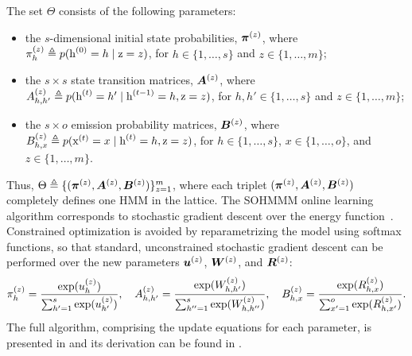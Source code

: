 The set $\Theta$ consists of the following parameters:
\begin{itemize}
	\item the $s$-dimensional initial state probabilities, ${\bm{\pi}}^{(z)}$, where ${\pi}_h^{(z)} \triangleq p({\textnormal{h}}^{(0)}=h \mid {\textnormal{z}}=z)$, for $h \in \{1,\dots,s\}$ and $z \in \{1,\dots,m\}$;
	\item the $s \times s$ state transition matrices, ${\bm{A}}^{(z)}$, where ${A}^{(z)}_{h,h'} \triangleq p({\textnormal{h}}^{(t)}=h' \mid {\textnormal{h}}^{(t-1)}=h, {\textnormal{z}}=z)$, for $h,h' \in \{1,\dots,s\}$ and $z \in \{1,\dots,m\}$;
	\item the $s \times o$ emission probability matrices, ${\bm{B}}^{(z)}$, where ${B}^{(z)}_{h,x} \triangleq p({\textnormal{x}}^{(t)}=x \mid {\textnormal{h}}^{(t)}=h, {\textnormal{z}}=z)$, for $h \in \{1,\dots,s\}$, $x \in \{1,\dots,o\}$, and $z \in \{1,\dots,m\}$.
\end{itemize}
Thus, $\Theta \triangleq \{({\bm{\pi}}^{(z)}, {\bm{A}}^{(z)}, {\bm{B}}^{(z)})\}_{z=1}^m$, where each triplet $({\bm{\pi}}^{(z)}, {\bm{A}}^{(z)}, {\bm{B}}^{(z)})$ completely defines one HMM in the lattice. The SOHMMM online learning algorithm corresponds to stochastic gradient descent over the energy function~. Constrained optimization is avoided by reparametrizing the model using softmax functions, so that standard, unconstrained stochastic gradient descent can be performed over the new parameters ${\bm{u}}^{(z)}$, ${\bm{W}}^{(z)}$, and ${\bm{R}}^{(z)}$:
\begin{equation}
{\pi}_h^{(z)} = \frac{\exp({u}_h^{(z)})}{\sum_{h'=1}^{s}\exp({u}_{h'}^{(z)})}, \quad
{A}^{(z)}_{h,h'} = \frac{\exp({W}^{(z)}_{h,h'})}{\sum_{h''=1}^{s} \exp({W}^{(z)}_{h,h''})}, \quad
{B}^{(z)}_{h,x} = \frac{\exp({R}^{(z)}_{h,x})}{\sum_{x'=1}^{o} \exp({R}^{(z)}_{h,x'})}.
\end{equation}
The full algorithm, comprising the update equations for each parameter, is presented in  and its derivation can be found in \citet{Ferles2008}.

